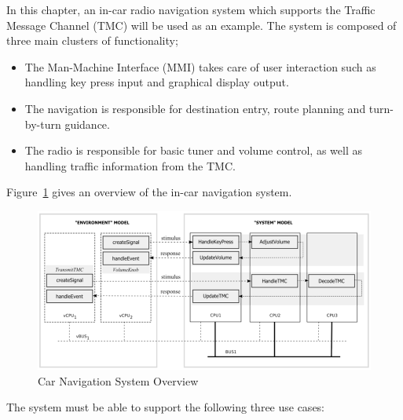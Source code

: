 In this chapter, an in-car radio navigation system which supports the Traffic Message Channel (TMC) will be used as an example. The system is composed of three main clusters of functionality; 
%
\begin{itemize}
\item The Man-Machine Interface (MMI) takes care of user interaction such as handling key press input and graphical display output. 
\item The navigation is responsible for destination entry, route planning and turn-by-turn guidance. 
\item The radio is responsible for basic tuner and volume control, as well as handling traffic information from the TMC.
\end{itemize}

Figure~\ref{fig:navigationoverview} gives an overview of the in-car navigation system. 

\begin{figure}[!h]
\begin{center}
  \includegraphics[width=4.5in]{figures/CarNavigationOverview}
  \caption[labelInTOC]{Car Navigation System Overview}
  \label{fig:navigationoverview}
\end{center}
\end{figure}

The system must be able to support the following three use cases:

